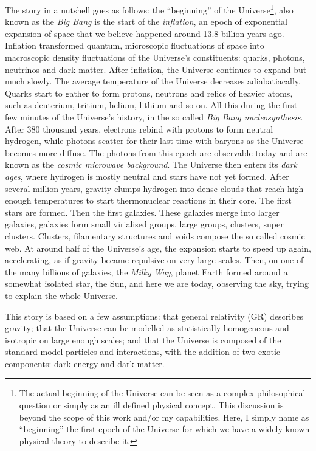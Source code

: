     The story in a nutshell goes as follows: the ``beginning''
    of the Universe\footnote{ The actual beginning of 
    the Universe can be seen as a complex philosophical question or simply as an 
    ill defined physical concept. This discussion is beyond the scope of this work 
    and/or my capabilities. Here, I simply name as ``beginning'' the first epoch of the Universe
    for which we have a widely known physical theory to describe it.}, 
    also known as the \emph{Big Bang} is the start of the \emph{inflation}, 
    an epoch of exponential 
    expansion of space that we believe happened around 13.8 billion years ago. 
    Inflation transformed quantum, microscopic fluctuations of space
    into macroscopic density fluctuations of the Universe's constituents:
    quarks, photons, neutrinos and dark matter. 
    After inflation, the Universe continues to expand but much slowly. 
    The average temperature of the Universe decreases adiabatiacally. 
    Quarks start to gather to form protons, neutrons and relics of heavier atoms, 
    such as deuterium, tritium, helium, lithium and so on. 
    All this during the first few minutes of the Universe's history, in the so called
    \emph{Big Bang nucleosynthesis}. 
    After 380 thousand years, electrons rebind with protons to form neutral 
    hydrogen, while photons scatter for their last time with baryons as the 
    Universe becomes more diffuse. 
    The photons from this epoch are observable today and are known as the 
    \emph{cosmic microwave background}. 
    The Universe then enters its \emph{dark ages}, where hydrogen is mostly neutral and 
    stars have not yet formed. 
    After several million years, gravity clumps hydrogen into dense clouds that reach 
    high enough temperatures to start thermonuclear reactions in their core. 
    The first stars are formed. Then the first galaxies. These galaxies merge into larger 
    galaxies, galaxies form small virialised groups, large groups, clusters, super clusters. 
    Clusters, filamentary structures and voids compose the so called cosmic web. 
    At around half of the Universe's age, the expansion starts to speed up again,
    accelerating, as if gravity became repulsive on very large scales. 
    Then, on one of the many billions of galaxies, the \emph{Milky Way}, 
    planet Earth formed around a somewhat isolated star, the Sun, 
    and here we are today, observing the sky, trying to explain the whole Universe. 

    This story is based on a few assumptions: that general relativity (GR) describes gravity; 
    that the Universe can be modelled as statistically homogeneous and isotropic on large enough
    scales; and that the Universe is composed of the standard model particles and interactions, 
    with the addition of two exotic components: dark energy and dark matter. 

